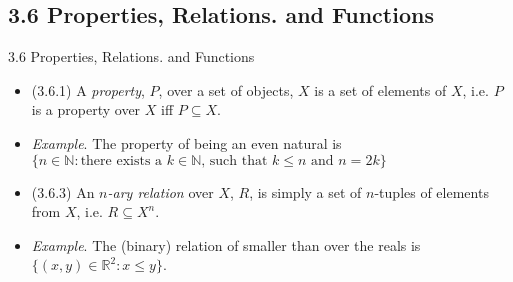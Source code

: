 \subsection{3.6 Properties, Relations. and Functions}
\begin{frame}{3.6 Properties, Relations. and Functions}

	\begin{itemize}
	
		\item (3.6.1) A \emph{property}, $P$, over a set of objects, $X$ is a set of elements of $X$, i.e. $P$ is a property over $X$ iff $P\subseteq X$.
	
		\item \emph{Example}. The property of being an even natural is $\{n\in\mathbb{N}:\text{there exists a }k\in\mathbb{N}\text{, such that }k\leq n\text{ and }n=2k\}$
		
		\item (3.6.3) An \emph{$n$-ary relation} over $X$, $R$, is simply a set of $n$-tuples of elements from $X$, i.e. $R\subseteq X^n$.
		
		\item \emph{Example}. The (binary) relation of smaller than over the reals is $\{(x,y)\in\mathbb{R}^2: x\leq y\}$.
	
	\end{itemize}

\end{frame}


